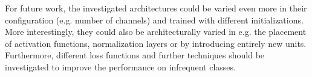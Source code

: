 \documentclass{article}
\begin{document}
For future work, the investigated architectures could be varied even more
in their configuration (e.g. number of channels) and trained with different 
initializations. More interestingly, they could also be architecturally varied 
in e.g. the placement of activation functions, normalization layers or by 
introducing entirely new units. Furthermore, different loss functions and 
further techniques should be investigated to improve the performance on 
infrequent classes.

\printbibliography
\end{document}
